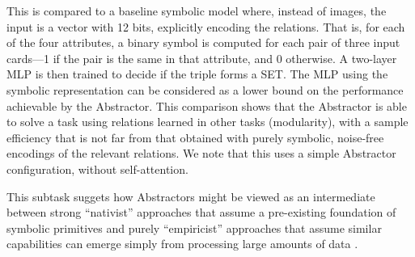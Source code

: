 This is compared to a baseline symbolic model where, instead of images, the input is a vector with 12 bits,
explicitly encoding the relations. That is, for each of the four attributes, a binary symbol is computed for each pair of three input cards---1 if the pair is the same in that attribute, and 0 otherwise. A two-layer MLP is then trained to decide if the triple forms a SET. The MLP using the symbolic representation can be considered as a lower bound on the performance achievable by the Abstractor. This comparison shows that the Abstractor is able to solve a task using relations learned in other tasks (modularity), with a sample efficiency that is not far from that obtained
with purely symbolic, noise-free encodings of the relevant relations. We note that this uses a simple Abstractor configuration, without self-attention.

This subtask suggets how Abstractors might be viewed as an intermediate between strong ``nativist'' approaches that assume a pre-existing foundation of symbolic primitives and purely ``empiricist'' approaches that assume
similar capabilities can emerge simply from processing large amounts of data \cite{howtogrowamind}.

